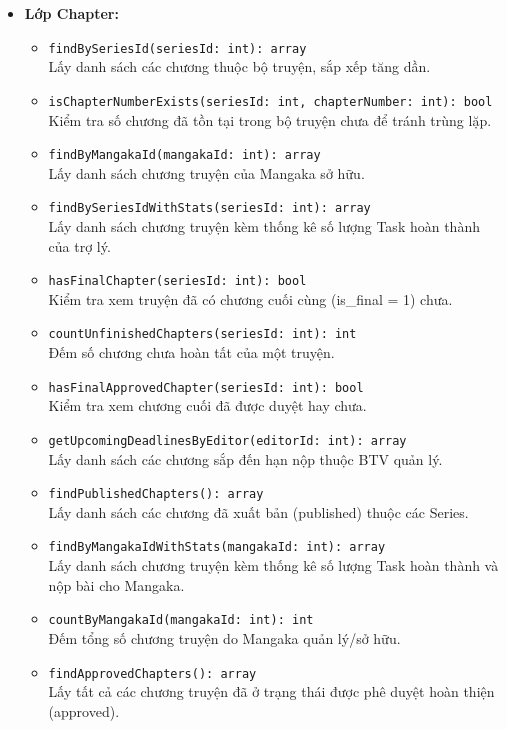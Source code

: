 \begin{itemize}
    \item \textbf{Lớp Chapter:}
    \begin{itemize}
        \item \texttt{findBySeriesId(seriesId: int): array}\\
            Lấy danh sách các chương thuộc bộ truyện, sắp xếp tăng dần.
        \item \texttt{isChapterNumberExists(seriesId: int, chapterNumber: int): bool}\\
            Kiểm tra số chương đã tồn tại trong bộ truyện chưa để tránh trùng lặp.
        \item \texttt{findByMangakaId(mangakaId: int): array}\\
            Lấy danh sách chương truyện của Mangaka sở hữu.
        \item \texttt{findBySeriesIdWithStats(seriesId: int): array}\\
            Lấy danh sách chương truyện kèm thống kê số lượng Task hoàn thành của trợ lý.
        \item \texttt{hasFinalChapter(seriesId: int): bool}\\
            Kiểm tra xem truyện đã có chương cuối cùng (is\_final = 1) chưa.
        \item \texttt{countUnfinishedChapters(seriesId: int): int}\\
            Đếm số chương chưa hoàn tất của một truyện.
        \item \texttt{hasFinalApprovedChapter(seriesId: int): bool}\\
            Kiểm tra xem chương cuối đã được duyệt hay chưa.
        \item \texttt{getUpcomingDeadlinesByEditor(editorId: int): array}\\
            Lấy danh sách các chương sắp đến hạn nộp thuộc BTV quản lý.
        \item \texttt{findPublishedChapters(): array}\\
            Lấy danh sách các chương đã xuất bản (published) thuộc các Series.
        \item \texttt{findByMangakaIdWithStats(mangakaId: int): array}\\
            Lấy danh sách chương truyện kèm thống kê số lượng Task hoàn thành và nộp bài cho Mangaka.
        \item \texttt{countByMangakaId(mangakaId: int): int}\\
            Đếm tổng số chương truyện do Mangaka quản lý/sở hữu.
        \item \texttt{findApprovedChapters(): array}\\
            Lấy tất cả các chương truyện đã ở trạng thái được phê duyệt hoàn thiện (approved).
    \end{itemize}


\end{itemize}
